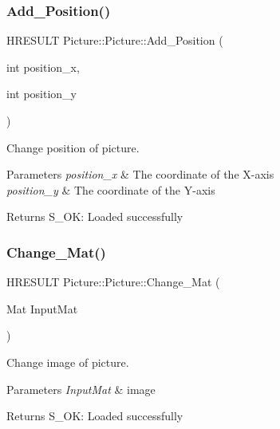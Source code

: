 \subsubsection{\texorpdfstring{Add\+\_\+\+Position()}{Add\_Position()}}
{\footnotesize\ttfamily H\+R\+E\+S\+U\+LT Picture\+::\+Picture\+::\+Add\+\_\+\+Position (\begin{DoxyParamCaption}\item[{int}]{position\+\_\+x,  }\item[{int}]{position\+\_\+y }\end{DoxyParamCaption})\hspace{0.3cm}{\ttfamily [inline]}}



Change position of picture. 


\begin{DoxyParams}{Parameters}
{\em position\+\_\+x} & The coordinate of the X-\/axis \\
\hline
{\em position\+\_\+y} & The coordinate of the Y-\/axis \\
\hline
\end{DoxyParams}
\begin{DoxyReturn}{Returns}
S\+\_\+\+OK\+: Loaded successfully 
\end{DoxyReturn}
\mbox{\label{class_picture_1_1_picture_ac9fa647455f925a5a429d37448cdb4bd}} 
\subsubsection{\texorpdfstring{Change\+\_\+\+Mat()}{Change\_Mat()}}
{\footnotesize\ttfamily H\+R\+E\+S\+U\+LT Picture\+::\+Picture\+::\+Change\+\_\+\+Mat (\begin{DoxyParamCaption}\item[{Mat}]{Input\+Mat }\end{DoxyParamCaption})\hspace{0.3cm}{\ttfamily [inline]}}



Change image of picture. 


\begin{DoxyParams}{Parameters}
{\em Input\+Mat} & image \\
\hline
\end{DoxyParams}
\begin{DoxyReturn}{Returns}
S\+\_\+\+OK\+: Loaded successfully 
\end{DoxyReturn}
\mbox{\label{class_picture_1_1_picture_af68efed56a47aecb9ccf5c2b505af2f2}} 
